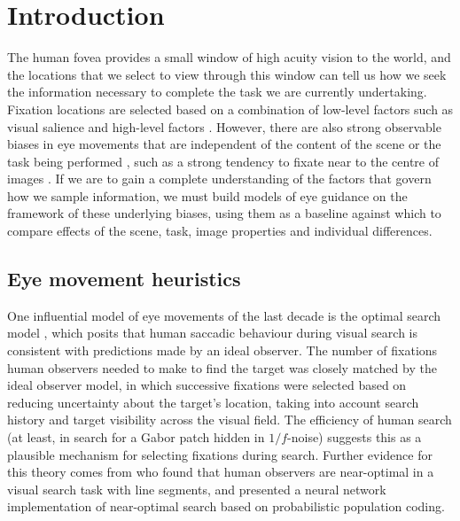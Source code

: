 \section{Introduction}

The human fovea provides a small window of high acuity vision to the world, and the locations that we select to view through this window can tell us how we seek the information necessary to complete the task we are currently undertaking. Fixation locations are selected based on a combination of low-level factors such as visual salience \citep{borji2013} and high-level factors \citep{yarbus1967, buswell1935, land2001}. However, there are also strong observable biases in eye movements that are independent of the content of the scene or the task being performed \citep{tatler-vincent2009, foulsham2010}, such as a strong tendency to fixate near to the centre of images \citep{tatler2007, canosa2003, stainer2013}. If we are to gain a complete understanding of the factors that govern how we sample information, we must build models of eye guidance on the framework of these underlying biases, using them as a baseline against which to compare effects of the scene, task, image properties and individual differences.

\subsection{Eye movement heuristics}

One influential model of eye movements of the last decade is the optimal search model \citep{najemnik-geisler2008}, which posits that human saccadic behaviour during visual search is consistent with predictions made by an ideal observer. The number of fixations human observers needed to make to find the target was closely matched by the ideal observer model, in which successive fixations were selected based on reducing uncertainty about the target's location, taking into account search history and target visibility across the visual field. The efficiency of human search (at least, in search for a Gabor patch hidden in $1/f$-noise) suggests this as a plausible mechanism for selecting fixations during search. Further evidence for this theory comes from \cite{ma2011} who found that human observers are near-optimal in a visual search task with line segments, and presented a neural network implementation of near-optimal search based on probabilistic population coding.  

